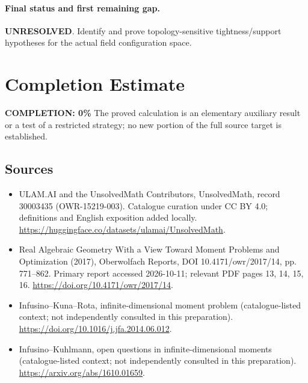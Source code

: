 \documentclass[11pt]{article}
\begin{document}
\paragraph{Final status and first remaining gap.}
\textbf{UNRESOLVED}. Identify and prove topology-sensitive tightness/support hypotheses for the actual field configuration space.

\section{Completion Estimate}
\noindent\textbf{COMPLETION: 0\%}
The proved calculation is an elementary auxiliary result or a test of a restricted strategy; no new portion of the full source target is established.

\subsection{Sources}
\begin{itemize}
\item[\hypertarget{source:30003435:1}{S1}] ULAM.AI and the UnsolvedMath Contributors, UnsolvedMath, record 30003435 (OWR-15219-003). Catalogue curation under CC BY 4.0; definitions and English exposition added locally.
\url{https://huggingface.co/datasets/ulamai/UnsolvedMath}.
\item[\hypertarget{source:30003435:2}{S2}] Real Algebraic Geometry With a View Toward Moment Problems and Optimization (2017), Oberwolfach Reports, DOI 10.4171/owr/2017/14, pp. 771--862. Primary report accessed 2026-10-11; relevant PDF pages 13, 14, 15, 16.
\url{https://doi.org/10.4171/owr/2017/14}.
\item[\hypertarget{source:30003435:3}{S3}] Infusino--Kuna--Rota, infinite-dimensional moment problem (catalogue-listed context; not independently consulted in this preparation).
\url{https://doi.org/10.1016/j.jfa.2014.06.012}.
\item[\hypertarget{source:30003435:4}{S4}] Infusino--Kuhlmann, open questions in infinite-dimensional moments (catalogue-listed context; not independently consulted in this preparation).
\url{https://arxiv.org/abs/1610.01659}.
\end{itemize}
\label{end:30003435}
\end{document}
